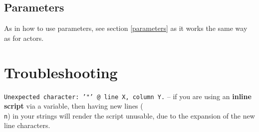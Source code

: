\documentclass[a4paper]{book}
\begin{document}
\section{Parameters}
As in how to use parameters, see section \ref{parameters} as it works the
same way as for actors.

\chapter{Troubleshooting}

\begin{tight_itemize}
    \item \texttt{Unexpected character: '"' @ line X, column Y.} -- if you are using an \textbf{inline script}
    via a variable, then having new lines (\texttt{\\n}) in your strings will render the script unusable, due
    to the expansion of the new line characters.
\end{tight_itemize}



\end{document}
